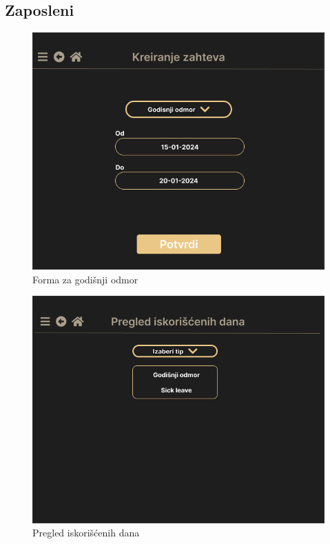 \documentclass[a4paper]{article}
\begin{document}
\clearpage
\newpage
\subsection{Zaposleni}

\begin{figure} [!ht]
    \begin{center}
        \includegraphics[scale=0.25]{UI/Zaposleni/GodisnjiOdmor.png}
    \end{center}
\caption{Forma za godišnji odmor}
\end{figure}

\begin{figure} [!ht]
    \begin{center}
        \includegraphics[scale=0.25]{UI/Zaposleni/PregledIskoricenihDana.png}
    \end{center}
\caption{Pregled iskorišćenih dana}
\end{figure}
\end{document}
